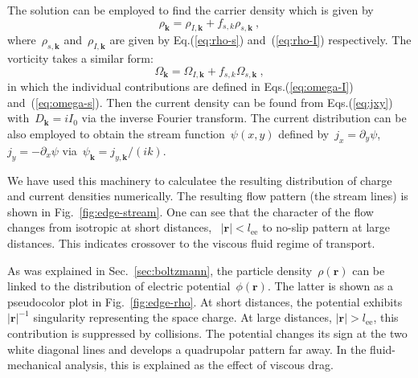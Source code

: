 \documentclass[preprint,aps,eqsecnum]{revtex4-1}
\begin{document}
The solution can be employed to find the carrier density which is given by
\begin{equation}
  \rho_{\bm k} = \rho_{I, {\bm k}} + f_{s, k} \rho_{s, {\bm k}}
  \ ,
\end{equation}
where~$\rho_{s, {\bm k}}$ and~$\rho_{I, {\bm k}}$
are given by Eq.(\ref{eq:rho-s})
and~(\ref{eq:rho-I}) respectively. The vorticity takes a similar form:
\begin{equation}
  \Omega_{\bm k} = \Omega_{I, {\bm k}} + f_{s, k} \Omega_{s, {\bm k}}
\ ,
\end{equation}
in which the individual contributions are defined in Eqs.(\ref{eq:omega-I})
and~(\ref{eq:omega-s}). Then the current density can be found
from Eqs.(\ref{eq:jxy}) with~$D_{\bm k} = i I_0$
via the inverse Fourier transform.
The current distribution can be also employed to obtain the stream
function~$\psi(x, y)$ defined by~$j_x = \partial_y \psi$,
$j_y = - \partial_x \psi$ via~$\psi_{\bm k} = j_{y, {\bm k}}/(ik)$.

We have used this machinery to calculatee the resulting distribution
of charge and current densities numerically. 
The resulting flow pattern (the stream lines) is shown in
Fig.~\ref{fig:edge-stream}. One can see that the character of the flow
changes from isotropic at short distances, ~$|{\bm r}| < l_\mathrm{ee}$ to
no-slip pattern at large distances. This indicates crossover to the viscous
fluid regime of transport.

As was explained in Sec.~\ref{sec:boltzmann}, the particle
density~$\rho({\bm r})$ can be linked to the distribution of electric
potential~$\phi({\bm r})$. The latter is shown as a pseudocolor
plot in Fig.~\ref{fig:edge-rho}. At short distances, the potential
exhibits~$|{\bm r}|^{-1}$ singularity representing the space charge.
At large distances, $|{\bm r}| > l_\mathrm{ee}$, this contribution
is suppressed by collisions.
The potential changes its sign at the two white diagonal lines and develops
a quadrupolar pattern far away. 
In the fluid-mechanical analysis\cite{bib:Levitov-Falkovich}, this is
explained as the effect of viscous drag. 
\end{document}
